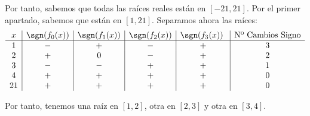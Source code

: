 \begin{ejercicio}
\begin{enumerate}
        Por tanto, sabemos que todas las raíces reales están en $\left[-21, 21\right]$.
        Por el primer apartado, sabemos que están en $\left[1,21\right]$.
        Separamos ahora las raíces:
        \begin{equation*}
            \begin{array}{c|c|c|c|c|c}
                x & \sgn(f_0(x)) & \sgn(f_1(x)) & \sgn(f_2(x)) & \sgn(f_3(x))\ & \text{Nº Cambios Signo}\\ \hline
                1 & - & + & - & + & 3\\
                2 & + & 0 & - & + & 2\\
                3 & - & - & + & + & 1\\
                4 & + & + & + & + & 0\\
                21 & + & + & + & + & 0
            \end{array}
        \end{equation*}

        Por tanto, tenemos una raíz en $\left[1,2\right]$, otra en $\left[2,3\right]$ y otra en $\left[3,4\right]$.
    \end{enumerate}
\end{ejercicio}

